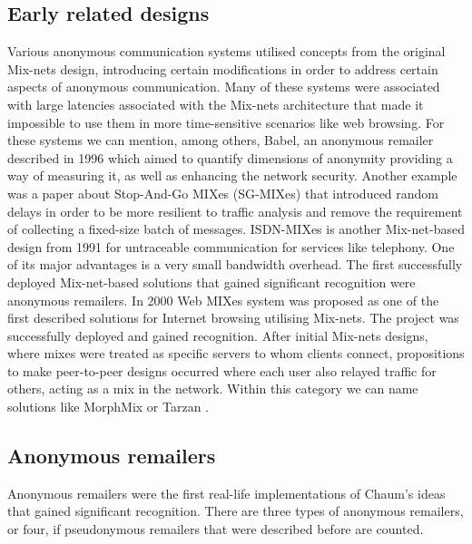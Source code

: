 \subsection{Early related designs}
Various anonymous communication systems utilised concepts from the original Mix-nets design, introducing certain modifications in order to address certain aspects of anonymous communication. 
Many of these systems were associated with large latencies associated with the Mix-nets architecture that made it impossible to use them in more time-sensitive scenarios like web browsing.
For these systems we can mention, among others, Babel, an anonymous remailer described in 1996 \cite{babel} which aimed to quantify dimensions of anonymity providing a way of measuring it, as well as enhancing the network security. Another example was a paper about Stop-And-Go MIXes (SG-MIXes) \cite{stop-and-go} that introduced random delays in order to be more resilient to traffic analysis and remove the requirement of collecting a fixed-size batch of messages.
ISDN-MIXes \cite{Pfitzmann91} is another Mix-net-based design from 1991 for untraceable communication for services like telephony. One of its major advantages is a very small bandwidth overhead.
The first successfully deployed Mix-net-based solutions that gained significant recognition were anonymous remailers.
In 2000 Web MIXes system \cite{web-mixes} was proposed as one of the first described solutions for Internet browsing utilising Mix-nets. The project was successfully deployed and gained recognition.
After initial Mix-nets designs, where mixes were treated as specific servers to whom clients connect, propositions to make peer-to-peer designs occurred where each user also relayed traffic for others, acting as a mix in the network. Within this category we can name solutions like MorphMix \cite{morphmix} or Tarzan \cite{tarzan}.

\subsection{Anonymous remailers}
Anonymous remailers were the first real-life implementations of Chaum's ideas that gained significant recognition. There are three types of anonymous remailers, or four, if pseudonymous remailers that were described before are counted.

